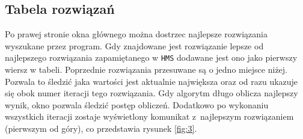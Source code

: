 \documentclass[10pt, a4paper]{article}
\begin{document}
\subsection{Tabela rozwiązań}
\label{subsec:rozwiazania}
Po prawej stronie okna głównego można dostrzec najlepsze rozwiązania wyszukane przez program. Gdy znajdowane jest rozwiązanie lepsze od najlepszego rozwiązania zapamiętanego w {\tt HMS} dodawane jest ono jako pierwszy wiersz w tabeli. Poprzednie rozwiązania przesuwane są o jedno miejsce niżej. Pozwala to śledzić jaka wartości jest aktualnie największa oraz od razu ukazuje się obok numer iteracji tego rozwiązania. Gdy algorytm długo oblicza najlepszy wynik, okno pozwala śledzić postęp obliczeń. Dodatkowo po wykonaniu wszystkich iteracji zostaje wyświetlony komunikat z~najlepszym rozwiązaniem (pierwszym od góry), co przedstawia rysunek \ref{fig:3}.
\end{document}
